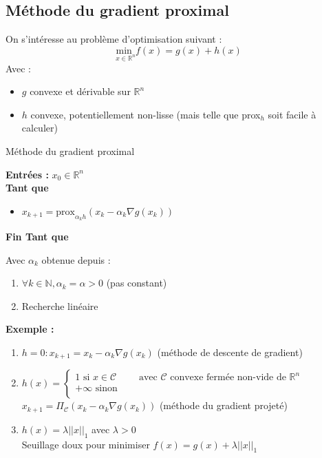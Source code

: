 \documentclass[12pt,a4paper]{article}
\begin{document}
\subsection{Méthode du gradient proximal}

On s'intéresse au problème d'optimisation suivant :\\
\begin{equation}
    \underset{x \in \mathbb{R}^n}{\text{min }} f(x) = g(x) + h(x) 
    \label{eq:pb4}
\end{equation}
Avec : \begin{itemize}
    \item $g$ convexe et dérivable sur $\mathbb{R}^n$
    \item $h$ convexe, potentiellement non-lisse (mais telle que prox$_h$ soit facile à calculer)
\end{itemize}

\newpage

\begin{algorithm}
    \caption{Méthode du gradient proximal}
    \textbf{Entrées :} $x_0 \in \mathbb{R}^n$\\
    \textbf{Tant que}\\
    \begin{itemize}
        \item $x_{k+1} = \text{prox}_{\alpha_k h} (x_k - \alpha_k \nabla g(x_k))$       
    \end{itemize}
    \textbf{Fin Tant que}
\end{algorithm}

Avec $\alpha_k$ obtenue depuis :
\begin{enumerate}[label=\roman*)]
    \item $\forall k \in \mathbb{N}, \alpha_k = \alpha > 0$ (pas constant)
    \item Recherche linéaire
\end{enumerate}

\noindent\textbf{Exemple :}
\begin{enumerate}[label=\roman*)]
    \item $h = 0 : x_{k+1} = x_k - \alpha_k \nabla g(x_k)$ (méthode de descente de gradient)
    \item $h(x) = \begin{cases}
        1 \text{ si } x \in \mathcal{C} \qquad \text{ avec } \mathcal{C} \text{ convexe fermée non-vide de } \mathbb{R}^n\\
        + \infty \text{ sinon}\\
    \end{cases}$\\
    $x_{k+1} = \Pi_{\mathcal{C}}(x_k - \alpha_k \nabla g(x_k))$ (méthode du gradient projeté)
    \item $h(x) = \lambda ||x||_1$ avec $\lambda > 0$\\
    Seuillage doux pour minimiser $f(x) = g(x) + \lambda ||x||_1$\\
\end{enumerate}
\end{document}
